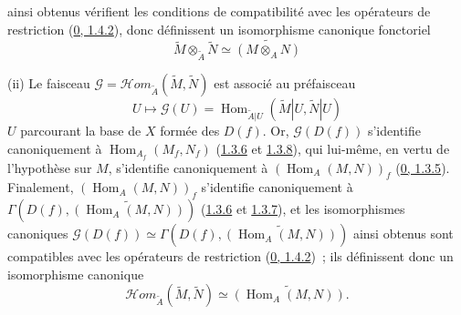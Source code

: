 ainsi obtenus vérifient les conditions de compatibilité avec les opérateurs de
restriction (\hyperref[0.1.4.2-fr]{0, 1.4.2}), donc définissent un isomorphisme
canonique fonctoriel
\[
  \widetilde{M}\otimes_{\widetilde{A}}\widetilde{N}
  \simeq\widetilde{(M\otimes_A N)}
\]

(ii) Le faisceau
$\mathscr{G}=\mathscr{H}\!om_{\widetilde{A}}(\widetilde{M},\widetilde{N})$
est associé au préfaisceau
\[
  U\longmapsto\mathscr{G}(U)
  =\operatorname{Hom}_{\widetilde{A}|U}
  (\widetilde{M}|U,\widetilde{N}|U)
\]
$U$ parcourant la base de $X$ formée des $D(f)$. Or,
$\mathscr{G}(D(f))$ s'identifie canoniquement à
$\operatorname{Hom}_{A_f}(M_f,N_f)$
(\hyperref[I.1.3.6-fr]{1.3.6} et \hyperref[I.1.3.8-fr]{1.3.8}), qui
lui-même, en vertu de l'hypothèse sur $M$, s'identifie canoniquement à
$(\operatorname{Hom}_A(M,N))_f$
(\hyperref[0.1.3.5-fr]{0, 1.3.5}). Finalement,
$(\operatorname{Hom}_A(M,N))_f$ s'identifie canoniquement à
$\Gamma(D(f),\widetilde{(\operatorname{Hom}_A(M,N))})$
(\hyperref[I.1.3.6-fr]{1.3.6} et \hyperref[I.1.3.7-fr]{1.3.7}), et les
isomorphismes canoniques
$\mathscr{G}(D(f))\simeq
\Gamma(D(f),\widetilde{(\operatorname{Hom}_A(M,N))})$ ainsi obtenus sont
compatibles avec les opérateurs de restriction
(\hyperref[0.1.4.2-fr]{0, 1.4.2})~; ils définissent donc un isomorphisme
canonique
\[
  \mathscr{H}\!om_{\widetilde{A}}(\widetilde{M},\widetilde{N})
  \simeq\widetilde{(\operatorname{Hom}_A(M,N))}.
\]

